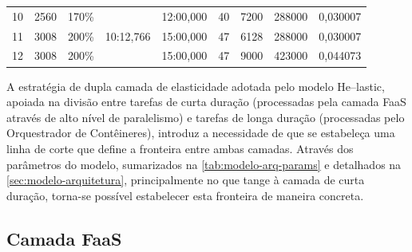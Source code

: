 \documentclass[english,brazilian]{UNISINOSmonografia} %
\newcommand\defaultFigureWidth{0.9}
\begin{document}
\begin{table}[tb]
\begin{minipage}{\defaultFigureWidth\textwidth}
\begin{tabularx}{\textwidth}{rrrrrWWrr}
			10 & 2560 & 170\% &  & 12:00,000 & 40 & 7200 & 288000 & 0,030007 \\
			11 & 3008 & 200\% & 10:12,766 & 15:00,000 & 47 & 6128 & 288000 & 0,030007 \\
			12 & 3008 & 200\% &  & 15:00,000 & 47 & 9000 & 423000 & 0,044073 \\ 
			\bottomrule
		\end{tabularx}
	\end{minipage}
\end{table}



A estratégia de dupla camada de elasticidade adotada pelo modelo \textsf{He}--lastic, apoiada na divisão entre tarefas de curta duração (processadas pela camada FaaS através de alto nível de paralelismo) e tarefas de longa duração (processadas pelo Orquestrador de Contêineres), introduz a necessidade de que se estabeleça uma linha de corte que define a fronteira entre ambas camadas.
Através dos parâmetros do modelo, sumarizados na \autoref{tab:modelo-arq-params} e detalhados na \autoref{sec:modelo-arquitetura}, principalmente no que tange à camada de curta duração, torna-se possível estabelecer esta fronteira de maneira concreta.


\subsection{Camada FaaS}
\label{sec:modelo-custben-faas}
\end{document}
